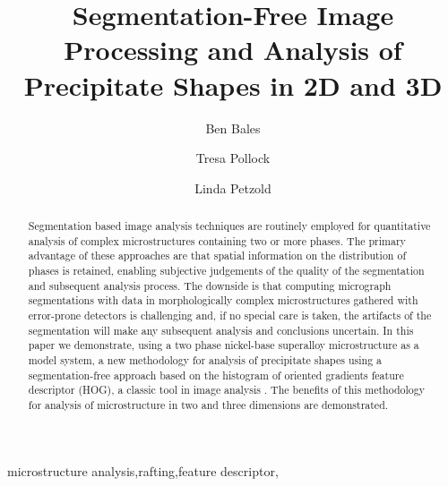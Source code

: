 \documentclass[review]{elsarticle}
\date{}
\begin{document}
	\begin{frontmatter}
		\title{Segmentation-Free Image Processing and Analysis of Precipitate Shapes in 2D and 3D}

		\author[mech]{Ben Bales}
		\author[mat]{Tresa Pollock}
		\author[mech]{Linda Petzold}
		
		\address[mech]{University of California, Department of Mechanical Engineering, Santa Barbara, CA 93106-5070}
		\address[mat]{Materials Department, Engineering II Building, 1355 University of California, Santa Barbara, Santa Barbara, CA 93106-5050}

		\begin{abstract}
		Segmentation based image analysis techniques are routinely employed for quantitative analysis of complex microstructures containing two or more phases.  The primary advantage of these approaches are that spatial information on the distribution of phases is retained, enabling subjective judgements of the quality of the segmentation and subsequent analysis process. The downside is that computing micrograph segmentations with data in morphologically complex microstructures gathered with error-prone detectors is challenging and, if no special care is taken, the artifacts of the segmentation will make any subsequent analysis and conclusions uncertain. In this paper we demonstrate, using a two phase nickel-base superalloy microstructure as a model system, a new methodology for analysis of precipitate shapes using a segmentation-free approach based on the histogram of oriented gradients  feature descriptor (HOG), a classic tool in image analysis \cite{gradtex, hog, girsh}. The benefits of this methodology for analysis of microstructure in two and three dimensions are demonstrated.
		\end{abstract}

		\begin{keyword}
			microstructure analysis\sep rafting\sep feature descriptor\sep 
		\end{keyword}
	\end{frontmatter}
\end{document}
